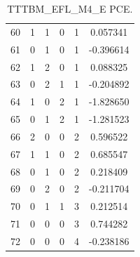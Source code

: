 \documentclass[preprint,12pt]{elsarticle}
\begin{document}
\begin{table}
\begin{minipage}[h!]{0.23\textwidth}
{\begin{tabular}{|c|ccccc|}
60 &   1 &   1 &   0 &   1 &   0.057341 \\
61 &   0 &   1 &   0 &   1 &  -0.396614 \\
62 &   1 &   2 &   0 &   1 &   0.088325 \\
63 &   0 &   2 &   1 &   1 &  -0.204892 \\
64 &   1 &   0 &   2 &   1 &  -1.828650 \\
65 &   0 &   1 &   2 &   1 &  -1.281523 \\
66 &   2 &   0 &   0 &   2 &   0.596522 \\
67 &   1 &   1 &   0 &   2 &   0.685547 \\
68 &   0 &   1 &   0 &   2 &   0.218409 \\
69 &   0 &   2 &   0 &   2 &  -0.211704 \\
70 &   0 &   1 &   1 &   3 &   0.212514 \\
71 &   0 &   0 &   0 &   3 &   0.744282 \\
72 &   0 &   0 &   0 &   4 &  -0.238186 \\
\hline
\end{tabular}}
\caption{\tiny TTTBM\_EFL\_M4\_E PCE.}
\end{minipage}%
%
\bigskip
%
\begin{minipage}[h!]{0.23\textwidth}
\end{minipage}
\end{table}
\end{document}
